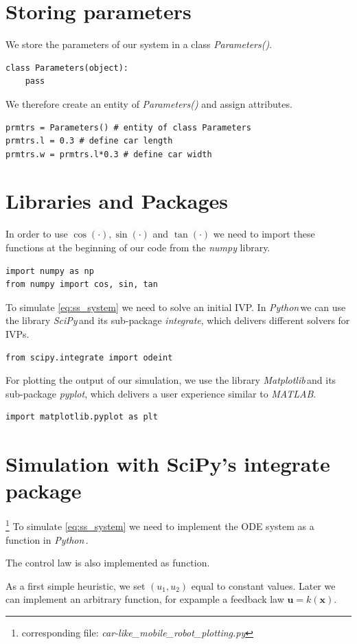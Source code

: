 \documentclass[a4paper,11pt,headings=standardclasses]{scrartcl}%
\newcommand{\py}{\emph{Python}\,}
\newcommand{\scipy}{\emph{SciPy}\,}
\newcommand{\mpl}{\emph{Matplotlib}\,}
\begin{document}
\section{Storing parameters}
We store the parameters of our system in a class \emph{Parameters()}.
\begin{lstlisting}
class Parameters(object):
    pass
\end{lstlisting}
We therefore create an entity of \emph{Parameters()} and assign attributes.
\begin{lstlisting}
prmtrs = Parameters() # entity of class Parameters
prmtrs.l = 0.3 # define car length
prmtrs.w = prmtrs.l*0.3 # define car width
\end{lstlisting}

\section{Libraries and Packages}
In order to use $\cos(\cdot), \sin(\cdot)$ and $\tan(\cdot)$ we need to import these functions at the beginning of our code from the \emph{numpy} library.
\begin{lstlisting}
import numpy as np 
from numpy import cos, sin, tan
\end{lstlisting}
To simulate \eqref{eq:ss_system} we need to solve an initial IVP. In \py we can use the library \scipy and its sub-package \emph{integrate}, which delivers different solvers for IVPs.
\begin{lstlisting}
from scipy.integrate import odeint
\end{lstlisting}
For plotting the output of our simulation, we use the library \mpl and its sub-package \emph{pyplot}, which delivers a user experience similar to \emph{MATLAB}.
\begin{lstlisting}
import matplotlib.pyplot as plt
\end{lstlisting}
\section{Simulation with SciPy's integrate package}
\label{sec:simulation}
\footnote{corresponding file: \emph{car-like\_mobile\_robot\_plotting.py}}
To simulate \eqref{eq:ss_system} we need to implement the ODE system as a function in \py.

The control law is also implemented as function.

As a first simple heuristic, we set $(u_1, u_2)$ equal to constant values. Later we can implement an arbitrary function, for expample a feedback law $\mathbf{u}=k(\mathbf{x})$.
\end{document}
